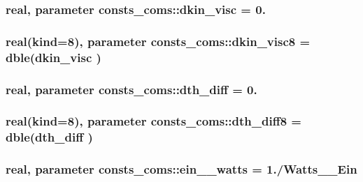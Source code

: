 \subsubsection[{\texorpdfstring{dkin\+\_\+visc}{dkin_visc}}]{\setlength{\rightskip}{0pt plus 5cm}real, parameter consts\+\_\+coms\+::dkin\+\_\+visc = 0.}\hypertarget{namespaceconsts__coms_a2599993b07c6660c7d40283df30bf850}{}\label{namespaceconsts__coms_a2599993b07c6660c7d40283df30bf850}
\subsubsection[{\texorpdfstring{dkin\+\_\+visc8}{dkin_visc8}}]{\setlength{\rightskip}{0pt plus 5cm}real(kind=8), parameter consts\+\_\+coms\+::dkin\+\_\+visc8 = dble({\bf dkin\+\_\+visc} )}\hypertarget{namespaceconsts__coms_a1b2932c7fcf0fd58caa884160e4fb2e8}{}\label{namespaceconsts__coms_a1b2932c7fcf0fd58caa884160e4fb2e8}
\subsubsection[{\texorpdfstring{dth\+\_\+diff}{dth_diff}}]{\setlength{\rightskip}{0pt plus 5cm}real, parameter consts\+\_\+coms\+::dth\+\_\+diff = 0.}\hypertarget{namespaceconsts__coms_a3e11fe776d94f12ef432f8813a02e384}{}\label{namespaceconsts__coms_a3e11fe776d94f12ef432f8813a02e384}
\subsubsection[{\texorpdfstring{dth\+\_\+diff8}{dth_diff8}}]{\setlength{\rightskip}{0pt plus 5cm}real(kind=8), parameter consts\+\_\+coms\+::dth\+\_\+diff8 = dble({\bf dth\+\_\+diff} )}\hypertarget{namespaceconsts__coms_a6984abec74717e326619006a024c3fd8}{}\label{namespaceconsts__coms_a6984abec74717e326619006a024c3fd8}
\subsubsection[{\texorpdfstring{ein\+\_\+2\+\_\+watts}{ein_2_watts}}]{\setlength{\rightskip}{0pt plus 5cm}real, parameter consts\+\_\+coms\+::ein\+\_\+\_\+watts = 1./Watts\+\_\+\_\+\+Ein}\hypertarget{namespaceconsts__coms_a6eb4fb188bbbc09a5b24e1ffa57e03aa}{}\label{namespaceconsts__coms_a6eb4fb188bbbc09a5b24e1ffa57e03aa}
